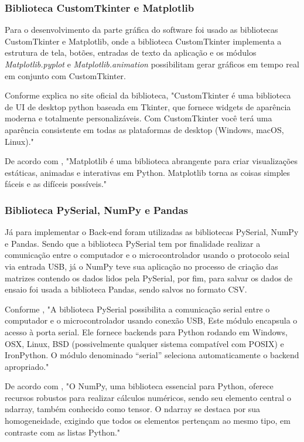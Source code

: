\subsubsection{Biblioteca CustomTkinter e Matplotlib}

Para o desenvolvimento da parte gráfica do software foi usado as bibliotecas CustomTkinter e Matplotlib, onde a biblioteca CustomTkinter implementa a estrutura de tela, botões, entradas de texto da aplicação e os módulos \textit{Matplotlib.pyplot} e \textit{Matplotlib.animation} possibilitam gerar gráficos em tempo real em conjunto com CustomTkinter.

Conforme \cite{customtkinter} explica no site oficial da biblioteca, "CustomTkinter é uma biblioteca de UI de desktop python baseada em Tkinter, que fornece widgets de aparência moderna e totalmente personalizáveis. Com CustomTkinter você terá uma aparência consistente em todas as plataformas de desktop (Windows, macOS, Linux)."

De acordo com \cite{matplotlib}, "Matplotlib é uma biblioteca abrangente para criar visualizações estáticas, animadas e interativas em Python. Matplotlib torna as coisas simples fáceis e as difíceis possíveis."

\subsubsection{Biblioteca PySerial, NumPy e Pandas}
Já para implementar o Back-end foram utilizadas as bibliotecas PySerial, NumPy e Pandas. Sendo que a biblioteca PySerial tem por finalidade realizar a comunicação entre o computador e o microcontrolador usando o protocolo seial via entrada USB, já o NumPy teve sua aplicação no processo de criação das matrizes contendo os dados lidos pela PySerial, por fim, para salvar os dados de ensaio foi usada a biblioteca Pandas, sendo salvos no formato CSV.

Conforme \cite{pyserial}, "A biblioteca PySerial possibilita a comunicação serial entre o computador e o microcontrolador usando conexão USB, Este módulo encapsula o acesso à porta serial. Ele fornece backends para Python rodando em Windows, OSX, Linux, BSD (possivelmente qualquer sistema compatível com POSIX) e IronPython. O módulo denominado “serial” seleciona automaticamente o backend apropriado."


De acordo com \cite{numpy_opl}, "O NumPy, uma biblioteca essencial para Python, oferece recursos robustos para realizar cálculos numéricos, sendo seu elemento central o ndarray, também conhecido como tensor. O ndarray se destaca por sua homogeneidade, exigindo que todos os elementos pertençam ao mesmo tipo, em contraste com as listas Python."

